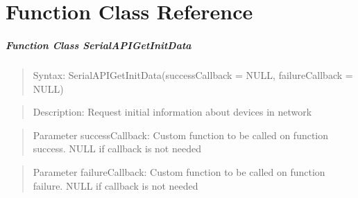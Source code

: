 \chapter{Function Class Reference}
\label{FunctionClasses}
 
\paragraph {Function Class SerialAPIGetInitData}
\begin{quote} Syntax: SerialAPIGetInitData(successCallback = NULL, failureCallback = NULL)\end{quote}
\begin{quote} Description: Request initial information about devices in network\end{quote}
\begin{quote} Parameter successCallback: Custom function to be called on function success. NULL if callback is not needed\end{quote} 
\begin{quote} Parameter failureCallback: Custom function to be called on function failure. NULL if callback is not needed\end{quote} 

